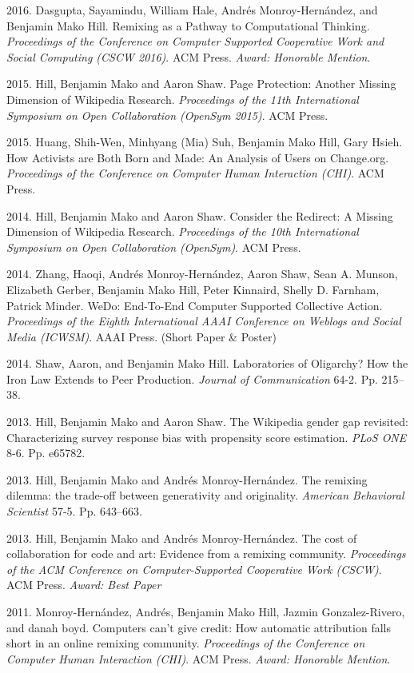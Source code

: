 \documentclass[10pt]{article}
\newenvironment{cvlist}{
\begin{list}{}{\leftmargin=3.0em \itemindent=-3.0em}
  \setlength{\itemsep}{0pt}
  \setlength{\parskip}{0em}
  \setlength{\parsep}{1em}
  \setlength{\parindent}{0em}}
{\vspace{1em}
\end{list}}
\begin{document}
\begin{cvlist}
\item 2016. Dasgupta, Sayamindu, William Hale, Andrés Monroy-Hernández, and Benjamin Mako Hill. Remixing as a Pathway to Computational Thinking. \emph{Proceedings of the Conference on Computer Supported Cooperative Work and Social Computing (CSCW 2016)}. ACM Press. \emph{Award: Honorable Mention}.
\item 2015. Hill, Benjamin Mako and Aaron Shaw. Page Protection: Another Missing Dimension of Wikipedia Research. \emph{Proceedings of the 11th International Symposium on Open Collaboration (OpenSym 2015)}. ACM Press.
\item 2015. Huang, Shih-Wen, Minhyang (Mia) Suh, Benjamin Mako Hill, Gary Hsieh. How Activists are Both Born and Made: An Analysis of Users on Change.org. \emph{Proceedings of the Conference on Computer Human Interaction (CHI)}. ACM Press. %
\item 2014. Hill, Benjamin Mako and Aaron Shaw. Consider the Redirect: A Missing Dimension of Wikipedia Research. \emph{Proceedings of the 10th International Symposium on Open Collaboration (OpenSym)}. ACM Press.
\item 2014. Zhang, Haoqi, Andrés Monroy-Hernández, Aaron Shaw, Sean A. Munson, Elizabeth Gerber, Benjamin Mako Hill, Peter Kinnaird, Shelly D. Farnham, Patrick Minder. WeDo: End-To-End Computer Supported Collective Action. \emph{Proceedings of the Eighth International AAAI Conference on Weblogs and Social Media (ICWSM)}. AAAI Press. (Short Paper \& Poster)
\item 2014. Shaw, Aaron, and Benjamin Mako Hill. Laboratories of Oligarchy? How the Iron Law Extends to Peer Production. \emph{Journal of Communication} 64-2. Pp. 215–38.
\item 2013. Hill, Benjamin Mako and Aaron Shaw. The Wikipedia gender gap revisited: Characterizing survey response bias with propensity score estimation. \emph{PLoS ONE} 8-6. Pp. e65782.
\item 2013. Hill, Benjamin Mako and Andrés Monroy-Hernández. The remixing dilemma: the trade-off between generativity and originality. \emph{American Behavioral Scientist} 57-5. Pp. 643--663.
\item 2013. Hill, Benjamin Mako and Andrés Monroy-Hernández. The cost of collaboration for code and art: Evidence from a remixing community. \emph{Proceedings of the ACM Conference on Computer-Supported Cooperative Work (CSCW)}. ACM Press. \emph{Award: Best Paper}
\item 2011. Monroy-Hernández, Andrés, Benjamin Mako Hill, Jazmin Gonzalez-Rivero, and danah boyd. Computers can't give credit: How automatic attribution falls short in an online remixing community. \emph{Proceedings of the Conference on Computer Human Interaction (CHI)}. ACM Press. \emph{Award: Honorable Mention}.

\end{cvlist}
\end{document}
